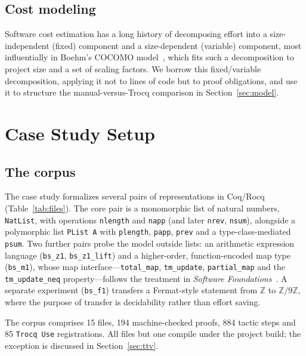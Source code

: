 \documentclass[runningheads]{llncs}
\begin{document}
\subsection{Cost modeling}
Software cost estimation has a long history of decomposing effort into a
size-independent (fixed) component and a size-dependent (variable)
component, most influentially in Boehm's COCOMO
model~\cite{boehm1981economics}, which fits such a decomposition to
project size and a set of scaling factors. We borrow this fixed/variable
decomposition, applying it not to lines of code but to proof obligations,
and use it to structure the manual-versus-Trocq comparison in
Section~\ref{sec:model}.


\section{Case Study Setup}
\label{sec:setup}

\subsection{The corpus}

The case study formalizes several pairs of representations in Coq/Rocq
(Table~\ref{tab:files}). The core pair is a monomorphic list of natural
numbers, \texttt{NatList}, with operations \texttt{nlength} and \texttt{napp}
(and later \texttt{nrev}, \texttt{nsum}), alongside a polymorphic list
\texttt{PList A} with \texttt{plength}, \texttt{papp}, \texttt{prev} and a
type-class-mediated \texttt{psum}. Two further pairs probe the model outside
lists: an arithmetic expression language (\texttt{bs\_z1}, \texttt{bs\_z1\_lift})
and a higher-order, function-encoded map type (\texttt{bs\_m1}), whose map
interface---\texttt{total\_map}, \texttt{tm\_update}, \texttt{partial\_map}
and the \texttt{tm\_update\_neq} property---follows the treatment in
\emph{Software Foundations}~\cite{softwarefoundations}. A separate experiment
(\texttt{bs\_f1}) transfers a Fermat-style statement from $\mathbb{Z}$ to
$\mathbb{Z}/9\mathbb{Z}$, where the purpose of transfer is decidability
rather than effort saving.

The corpus comprises 15 files, 194 machine-checked proofs, 884 tactic steps
and 85 \texttt{Trocq Use} registrations. All files but one compile under the
project build; the exception is discussed in Section~\ref{sec:ttv}.
\end{document}
